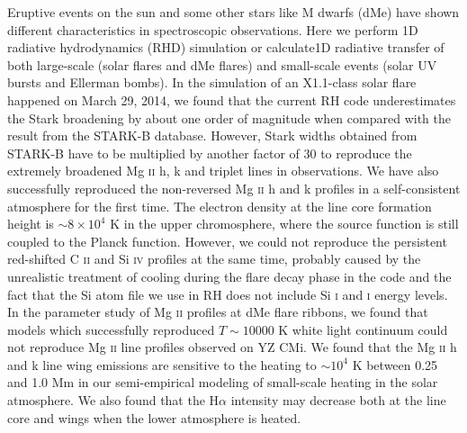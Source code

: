 \begin{eabstract}
	Eruptive events on the sun and some other stars like M dwarfs (dMe) have shown different characteristics in spectroscopic observations. Here we perform 1D radiative hydrodynamics (RHD) simulation or calculate1D radiative transfer of both large-scale (solar flares and dMe flares) and small-scale events (solar UV bursts and Ellerman bombs). In the simulation of an X1.1-class solar flare happened on March 29, 2014, we found that the current RH code underestimates the Stark broadening by about one order of magnitude when compared with the result from the STARK-B database. However, Stark widths obtained from STARK-B  have to be multiplied by another factor of 30 to reproduce the extremely broadened Mg \textsc{ii} h, k and triplet lines in observations. We have also successfully reproduced the non-reversed Mg \textsc{ii} h and k profiles in a self-consistent atmosphere for the first time. The electron density at the line core formation height is $\sim 8\times 10^4$ K in the upper chromosphere, where the source function is still coupled to the Planck function. However, we could not reproduce the persistent red-shifted C \textsc{ii} and Si \textsc{iv} profiles at the same time, probably caused by the unrealistic treatment of cooling during the flare decay phase in the code and the fact that the Si atom file we use in RH does not include Si \textsc{i} and \textsc{i} energy levels. In the parameter study of Mg \textsc{ii} profiles at dMe flare ribbons, we found that models which successfully reproduced $T\sim 10000$ K white light continuum could not reproduce Mg \textsc{ii} line profiles observed on YZ CMi. We found that the Mg \textsc{ii} h and k line wing emissions are sensitive to the heating to $\sim 10^4$ K between 0.25 and 1.0 Mm in our semi-empirical modeling of small-scale heating in the solar atmosphere. We also found that the H$\alpha$ intensity may decrease both at the line core and wings when the lower atmosphere is heated.
\end{eabstract}	
	
	
